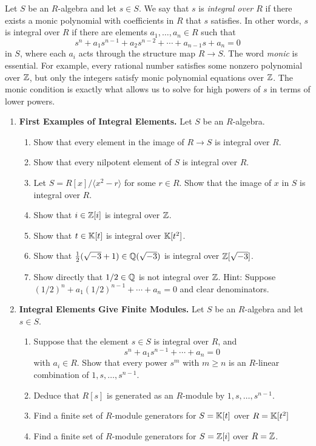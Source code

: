 \documentclass[12pt,reqno]{amsart}
\begin{document}
\hrulefill

Let $S$ be an $R$-algebra and let $s\in S$. We say that $s$ is \emph{integral over $R$} if there exists a monic polynomial with coefficients in $R$ that $s$ satisfies. In other words, $s$ is integral over $R$ if there are elements $a_1,\ldots,a_n\in R$ such that
\[
s^n+a_1s^{n-1}+a_2s^{n-2}+\cdots+a_{n-1}s+a_n=0
\]
in $S$, where each $a_i$ acts through the structure map $R\to S$. The word \emph{monic} is essential. For example, every rational number satisfies some nonzero polynomial over $\mathbb{Z}$, but only the integers satisfy monic polynomial equations over $\mathbb{Z}$. The monic condition is exactly what allows us to solve for high powers of $s$ in terms of lower powers.

\hrulefill

\begin{enumerate}[leftmargin=*, resume=problems]

\item \textbf{First Examples of Integral Elements.} Let $S$ be an $R$-algebra.
\begin{enumerate}
    \item Show that every element in the image of $R\to S$ is integral over $R$.
    \item Show that every nilpotent element of $S$ is integral over $R$.
    \item Let $S=R[x]/\langle x^2-r\rangle$ for some $r\in R$. Show that the image of $x$ in $S$ is integral over $R$.
    \item Show that $i\in \mathbb{Z}[i]$ is integral over $\mathbb{Z}$.
    \item Show that $t\in \mathbb{K}[t]$ is integral over $\mathbb{K}[t^2]$.
    \item Show that $\frac{1}{2}(\sqrt{-3}+1)\in \mathbb{Q}(\sqrt{-3})$ is integral over $\mathbb{Z}[\sqrt{-3}]$. 
    \item Show directly that $1/2\in \mathbb{Q}$ is not integral over $\mathbb{Z}$. Hint: Suppose $(1/2)^n+a_1(1/2)^{n-1}+\cdots+a_n=0$ and clear denominators.
\end{enumerate}

\item \textbf{Integral Elements Give Finite Modules.} Let $S$ be an $R$-algebra and let $s\in S$.
\begin{enumerate}
    \item Suppose that the element $s\in S$ is integral over $R$, and 
    \[
    s^n+a_1s^{n-1}+\cdots+a_n=0
    \]
    with $a_i\in R$. Show that every power $s^m$ with $m\geq n$ is an $R$-linear combination of $1,s,\ldots,s^{n-1}$.
    \item Deduce that $R[s]$ is generated as an $R$-module by $1,s,\ldots,s^{n-1}$.
    \item Find a finite set of $R$-module generators for $S=\mathbb{K}[t]$ over $R=\mathbb{K}[t^2]$
    \item Find a finite set of $R$-module generators for $S=\mathbb{Z}[i]$ over $R=\mathbb{Z}$. 
\end{enumerate}


\end{enumerate}
\end{document}
